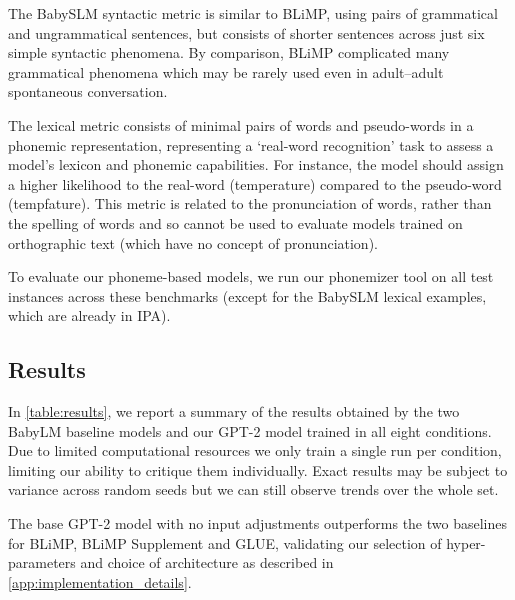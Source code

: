 The BabySLM syntactic metric is similar to BLiMP, using pairs of grammatical and ungrammatical sentences, but consists of shorter sentences across just six simple syntactic phenomena. By comparison, BLiMP complicated many grammatical phenomena which may be rarely used even in adult--adult spontaneous conversation. 

The lexical metric consists of minimal pairs of words and pseudo-words in a phonemic representation, representing a `real-word recognition' task to assess a model's lexicon and phonemic capabilities. For instance, the model should assign a higher likelihood to the real-word \texttt{} (temperature) compared to the pseudo-word \texttt{} (tempfature). This metric is related to the pronunciation of words, rather than the spelling of words and so cannot be used to evaluate models trained on orthographic text (which have no concept of pronunciation).%

To evaluate our phoneme-based models, we run our phonemizer tool on all test instances across these benchmarks (except for the BabySLM lexical examples, which are already in IPA). %

\subsection{Results}
\label{sec:results}

In \cref{table:results}, we report a summary of the results obtained by the two BabyLM baseline models and our \mbox{GPT-2} model trained in all eight conditions. Due to limited computational resources we only train a single run per condition, limiting our ability to critique them individually. Exact results may be subject to variance across random seeds but we can still observe trends over the whole set. 

The base \mbox{GPT-2} model with no input adjustments outperforms the two baselines for BLiMP, BLiMP Supplement and GLUE, validating our selection of hyper-parameters and choice of architecture as described in \cref{app:implementation_details}.

